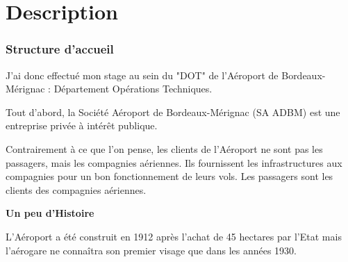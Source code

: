 \section{Description}

\subsubsection*{Structure d'accueil}

J'ai donc effectué mon stage au sein du "DOT" de l'Aéroport de Bordeaux-Mérignac : Département Opérations Techniques.

Tout d'abord, la Société Aéroport de Bordeaux-Mérignac (SA ADBM) est une entreprise privée à intérêt publique.

Contrairement à ce que l'on pense, les clients de l'Aéroport ne sont pas les passagers, mais les compagnies aériennes. Ils fournissent les infrastructures aux compagnies pour un bon fonctionnement de leurs vols. Les passagers sont les clients des compagnies aériennes.\newline


\textbf{Un peu d'Histoire}\newline

L'Aéroport a été construit en 1912 après l'achat de 45 hectares par l'Etat mais l'aérogare ne connaîtra son premier visage que dans les années 1930.

